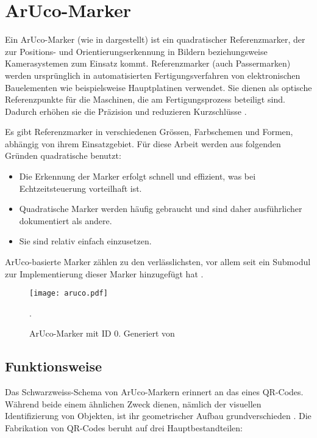 \section{ArUco-Marker}
\label{sec:aruco}
Ein ArUco-Marker (wie in  dargestellt) ist ein quadratischer Referenzmarker, der zur Positions- und Orientierungserkennung in Bildern beziehungsweise Kamerasystemen zum Einsatz kommt.
Referenzmarker (auch Passermarken) werden ursprünglich in automatisierten Fertigungsverfahren von elektronischen Bauelementen wie beispielsweise Hauptplatinen verwendet.
Sie dienen als optische Referenzpunkte für die Maschinen, die am Fertigungsprozess beteiligt sind.
Dadurch erhöhen sie die Präzision und reduzieren Kurzschlüsse \cite{Wiki:Passermarke}.

Es gibt Referenzmarker in verschiedenen Grössen, Farbschemen und Formen, abhängig von ihrem Einsatzgebiet.
Für diese Arbeit werden aus folgenden Gründen quadratische benutzt:

\begin{itemize}
    \item Die Erkennung der Marker erfolgt schnell und effizient, was bei Echtzeitsteuerung vorteilhaft ist.
    \item Quadratische Marker werden häufig gebraucht und sind daher ausführlicher dokumentiert als andere.
    \item Sie sind relativ einfach einzusetzen.
\end{itemize}

ArUco-basierte Marker zählen zu den verlässlichsten, vor allem seit  ein Submodul zur Implementierung dieser Marker hinzugefügt hat \cite{IJ:fiducial}.

\begin{figure}[H]
    \centering
        \texttt{[image: aruco.pdf]}
    \caption{ArUco-Marker mit ID 0. Generiert von \cite{chev:arucogen}}.
        \label{pic:marker0}
\end{figure}

\subsection{Funktionsweise}
\label{sub:fw}
Das Schwarzweiss-Schema von ArUco-Markern erinnert an das eines QR-Codes.
Während beide einem ähnlichen Zweck dienen, nämlich der visuellen Identifizierung von Objekten, ist ihr geometrischer Aufbau grundverschieden \cite{ten:qrcode}.
Die Fabrikation von QR-Codes beruht auf drei Hauptbestandteilen:


